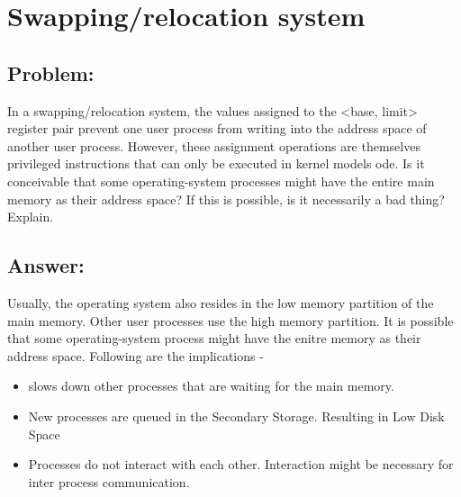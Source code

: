 \newpage
\section{Swapping/relocation system}
\subsection{Problem:}
In a swapping/relocation system, the values assigned to the <base, limit> register pair prevent
one user process from writing into the address space of another user process. However, these
assignment operations are themselves privileged instructions that can only be executed in kernel
models
ode.
 Is it conceivable that some operating-system processes might have the entire main memory
 as their address space? If this is possible, is it necessarily a bad thing? Explain.

 \subsection{Answer:}
Usually, the operating system also resides in the low memory partition of the main memory. Other user processes use the high memory partition. It is possible that some operating-system process might have the enitre memory as their address space. Following are the implications -
\begin{itemize}
    \item slows down other processes that are waiting for the main memory.
    \item New processes are queued in the Secondary Storage. Resulting in Low Disk Space
    \item Processes do not interact with each other. Interaction might be necessary for inter process communication.
\end{itemize}
